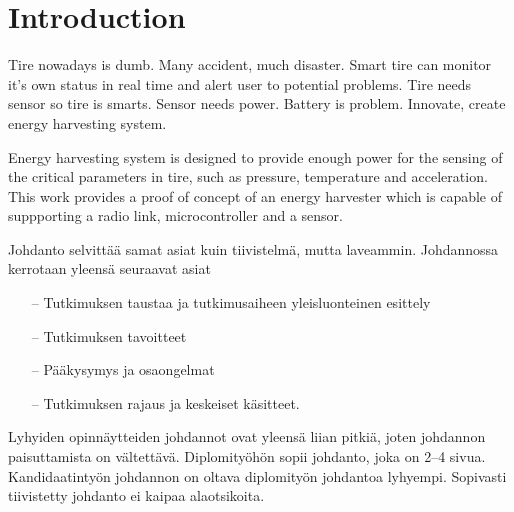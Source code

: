 \section{Introduction}

\thispagestyle{empty}

Tire nowadays is dumb. Many accident, much disaster. Smart tire can monitor it's own status in real time and alert user to potential problems.
Tire needs sensor so tire is smarts. Sensor needs power. Battery is problem. Innovate, create energy harvesting system. 

Energy harvesting system is designed to provide enough power for the sensing of the critical parameters in tire, such as pressure, temperature and acceleration. This work provides a proof of concept of an energy harvester which is capable of suppporting a radio link, microcontroller and a sensor. 



Johdanto selvitt\"a\"a samat asiat kuin tiivistelm\"a, mutta
laveammin. Johdannossa kerrotaan yleens\"a seuraavat asiat

\begin{itemize}
\item[--]Tutkimuksen taustaa ja tutkimusaiheen yleisluonteinen esittely
\item[--]Tutkimuksen tavoitteet
\item[--]P\"a\"akysymys ja osaongelmat
\item[--]Tutkimuksen rajaus ja keskeiset k\"asitteet.
\end{itemize}

Lyhyiden opinn\"aytteiden johdannot ovat yleens\"a liian pitki\"a, joten
johdannon paisuttamista on v\"altett\"av\"a. Diplomity\"oh\"on sopii johdanto,
joka on 2--4 sivua. %
Kandidaatinty\"on johdannon on oltava diplomity\"on
johdantoa lyhyempi. Sopivasti tiivistetty johdanto ei kaipaa alaotsikoita.


\clearpage
